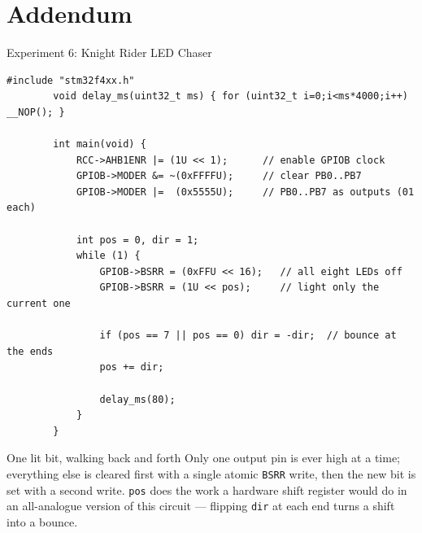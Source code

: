 \documentclass[9pt,aspectratio=169,xcolor=table]{beamer}
\begin{document}
\section{Addendum}

%
%

\begin{frame}[fragile]{Experiment 6: Knight Rider LED Chaser}
	\begin{lstlisting}[style=myc, basicstyle=\ttfamily\footnotesize]
		#include "stm32f4xx.h"
		void delay_ms(uint32_t ms) { for (uint32_t i=0;i<ms*4000;i++) __NOP(); }

		int main(void) {
			RCC->AHB1ENR |= (1U << 1);      // enable GPIOB clock
			GPIOB->MODER &= ~(0xFFFFU);     // clear PB0..PB7
			GPIOB->MODER |=  (0x5555U);     // PB0..PB7 as outputs (01 each)

			int pos = 0, dir = 1;
			while (1) {
				GPIOB->BSRR = (0xFFU << 16);   // all eight LEDs off
				GPIOB->BSRR = (1U << pos);     // light only the current one

				if (pos == 7 || pos == 0) dir = -dir;  // bounce at the ends
				pos += dir;

				delay_ms(80);
			}
		}
	\end{lstlisting}

	\vspace{2mm}
	\begin{block}{One lit bit, walking back and forth}
		Only one output pin is ever high at a time; everything else is
		cleared first with a single \alert{atomic} \texttt{BSRR} write,
		then the new bit is set with a second write. \texttt{pos} does
		the work a hardware shift register would do in an all-analogue
		version of this circuit --- flipping \texttt{dir} at each end
		turns a shift into a \alert{bounce}.
	\end{block}
\end{frame}
\end{document}
